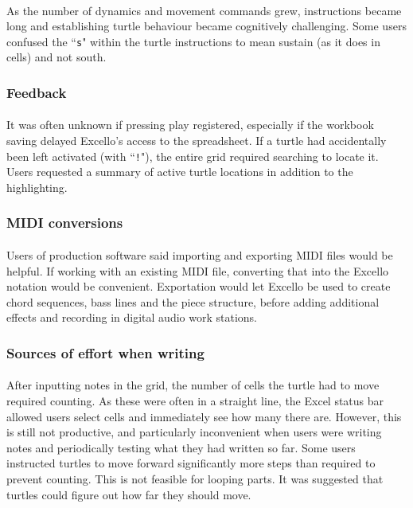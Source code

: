 \paragraph{} As the number of dynamics and movement commands grew, instructions became long and establishing turtle behaviour became cognitively challenging. Some users confused the ``\texttt{s}" within the turtle instructions to mean sustain (as it does in cells) and not south.

\subsubsection{Feedback}

\paragraph{} It was often unknown if pressing play registered, especially if the workbook saving delayed Excello's access to the spreadsheet. If a turtle had accidentally been left activated (with ``\texttt{!}"), the entire grid required searching to locate it. Users requested a summary of active turtle locations in addition to the highlighting.

\subsubsection{MIDI conversions}

\paragraph{} Users of production software said importing and exporting MIDI files would be helpful. If working with an existing MIDI file, converting that into the Excello notation would be convenient. Exportation would let Excello be used to create chord sequences, bass lines and the piece structure, before adding additional effects and recording in digital audio work stations.

\subsubsection{Sources of effort when writing}

\paragraph{} After inputting notes in the grid, the number of cells the turtle had to move required counting. As these were often in a straight line, the Excel status bar allowed users select cells and immediately see how many there are. However, this is still not productive, and particularly inconvenient when users were writing notes and periodically testing what they had written so far. Some users instructed turtles to move forward significantly more steps than required to prevent counting. This is not feasible for looping parts. It was suggested that turtles could figure out how far they should move.

